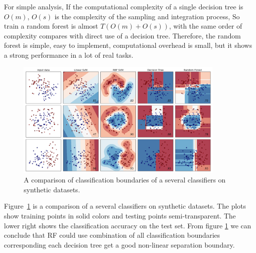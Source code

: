 \documentclass[master]{IPSstyle}
\begin{document}
{For simple analysis, If the computational complexity of a single decision tree is $O (m)$, $O(s)$ is the complexity of the sampling and integration process, So train a random forest is almost $T(O(m)+O(s))$, with the same order of complexity compares with direct use of a decision tree. Therefore, the random forest is simple, easy to implement, computational overhead is small, but it shows a strong performance in a lot of real tasks.

\begin{figure}[H]
    \centering
    \includegraphics[width=0.9\textwidth]{figures/ch3_SVM_RF_boundary.png}
    \caption{A comparison of classification boundaries of a several classifiers on synthetic datasets.}
    \label{fig:SVM_RF_boundary}
\end{figure}
Figure~\ref{fig:SVM_RF_boundary} is a comparison of a several classifiers on synthetic datasets. The plots show training points in solid colors and testing points semi-transparent. The lower right shows the classification accuracy on the test set. From figure \ref{fig:SVM_RF_boundary} we can conclude that RF could use combination of all classification boundaries corresponding each decision tree get a good non-linear separation boundary. 

}
\end{document}
